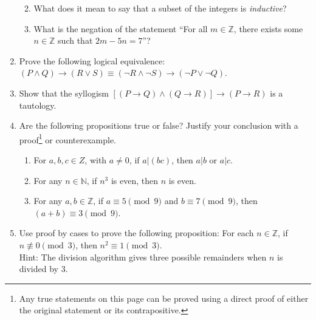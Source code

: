 \documentclass[12pt]{article}
\newcommand{\points}[1]{\marginpar{\hspace{24pt}[#1]}}
\newcommand{\N}{\mathbb{N}}
\newcommand{\Z}{\mathbb{Z}}
\begin{document}
\begin{enumerate}
\begin{enumerate}
\vspace{1in}

\item What does it mean to say that a subset of the integers is {\em inductive}? \points{2}

\vspace{1.25in}

\item What is the negation of the statement ``For all $m\in\Z$, there exists some $n\in \Z$ such that $2m-5n=7$''? \points{2}



\end{enumerate}
\newpage

\item Prove the following logical equivalence: $(P\wedge Q)\to (R\vee S)\equiv (\neg R\wedge \neg S)\to (\neg P\vee \neg Q)$. \points{6}

\vspace{3.5in}

\item  Show that the syllogism $[(P\to Q)\wedge (Q\to R)]\to (P\to R)$ is a tautology. \points{6}

\newpage

\item Are the following propositions true or false? Justify your conclusion with a proof\footnote{Any true statements on this page can be proved using a direct proof of either the original statement or its contrapositive.} or counterexample.
\begin{enumerate}
\item For $a,b,c\in Z$, with $a\neq 0$, if $a|(bc)$, then $a|b$ or $a|c$.\points{4}

\vspace{2in}

\item For any $n\in \N$, if $n^3$ is even, then $n$ is even. \points{4}

\vspace{2.5in}

\item  For any $a,b\in\Z$, if $a\equiv 5\pmod{9}$ and $b\equiv 7\pmod{9}$, then $(a+b)\equiv 3\pmod{9}$.\points{4}

\end{enumerate}
\newpage

\item Use proof by cases to prove the following proposition: For each $n\in\Z$, if $n\not\equiv 0\pmod{3}$, then $n^2\equiv 1\pmod{3}$. \points{5}\\
Hint: The division algorithm gives three possible remainders when $n$ is divided by 3.


\end{enumerate}
\end{document}
